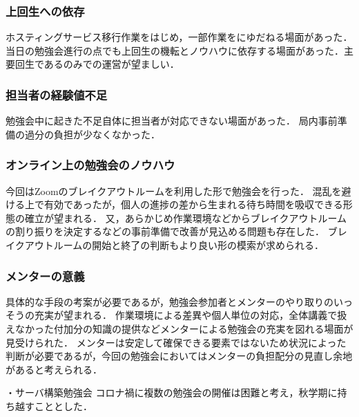 \subsubsection*{上回生への依存}
ホスティングサービス移行作業をはじめ，一部作業を\fourthGrade{}にゆだねる場面があった．
当日の勉強会進行の点でも上回生の機転とノウハウに依存する場面があった．主要回生である\secondGrade{}のみでの運営が望ましい．
\subsubsection*{担当者の経験値不足}
勉強会中に起きた不足自体に担当者が対応できない場面があった．
局内事前準備の過分の負担が少なくなかった．
\subsubsection*{オンライン上の勉強会のノウハウ}
今回はZoomのブレイクアウトルームを利用した形で勉強会を行った．
混乱を避ける上で有効であったが，個人の進捗の差から生まれる待ち時間を吸収できる形態の確立が望まれる．
又，あらかじめ作業環境などからブレイクアウトルームの割り振りを決定するなどの事前準備で改善が見込める問題も存在した．
ブレイクアウトルームの開始と終了の判断もより良い形の模索が求められる．
\subsubsection*{メンターの意義}
具体的な手段の考案が必要であるが，勉強会参加者とメンターのやり取りのいっそうの充実が望まれる．
作業環境による差異や個人単位の対応，全体講義で扱えなかった付加分の知識の提供などメンターによる勉強会の充実を図れる場面が見受けられた．
メンターは安定して確保できる要素ではないため状況によった判断が必要であるが，今回の勉強会においてはメンターの負担配分の見直し余地があると考えられる．

・サーバ構築勉強会
コロナ禍に複数の勉強会の開催は困難と考え，秋学期に持ち越すこととした．

